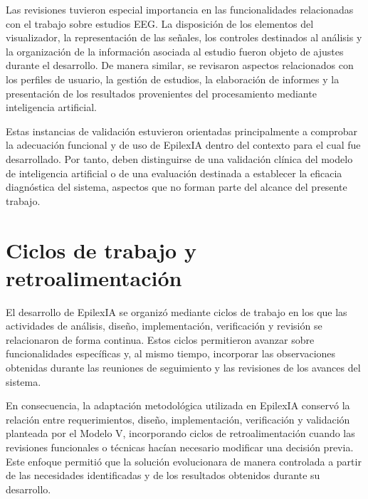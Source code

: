 Las revisiones tuvieron especial importancia en las funcionalidades
relacionadas con el trabajo sobre estudios EEG. La disposición de los
elementos del visualizador, la representación de las señales, los controles
destinados al análisis y la organización de la información asociada al estudio
fueron objeto de ajustes durante el desarrollo. De manera similar, se revisaron
aspectos relacionados con los perfiles de usuario, la gestión de estudios, la
elaboración de informes y la presentación de los resultados provenientes del
procesamiento mediante inteligencia artificial.

Estas instancias de validación estuvieron orientadas principalmente a comprobar
la adecuación funcional y de uso de EpilexIA dentro del contexto para el cual
fue desarrollado. Por tanto, deben distinguirse de una validación clínica del
modelo de inteligencia artificial o de una evaluación destinada a establecer
la eficacia diagnóstica del sistema, aspectos que no forman parte del alcance
del presente trabajo.

\section{Ciclos de trabajo y retroalimentación}
\label{sec:ciclos-retroalimentacion}

El desarrollo de EpilexIA se organizó mediante ciclos de trabajo en los que
las actividades de análisis, diseño, implementación, verificación y revisión
se relacionaron de forma continua. Estos ciclos permitieron avanzar sobre
funcionalidades específicas y, al mismo tiempo, incorporar las observaciones
obtenidas durante las reuniones de seguimiento y las revisiones de los avances
del sistema.

En consecuencia, la adaptación metodológica utilizada en EpilexIA conservó la
relación entre requerimientos, diseño, implementación, verificación y
validación planteada por el Modelo V, incorporando ciclos de retroalimentación
cuando las revisiones funcionales o técnicas hacían necesario modificar una
decisión previa. Este enfoque permitió que la solución evolucionara de manera
controlada a partir de las necesidades identificadas y de los resultados
obtenidos durante su desarrollo.

